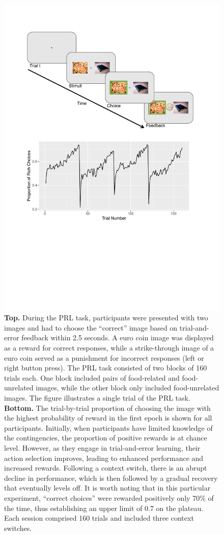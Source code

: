 \documentclass[
  man,floatsintext]{apa6}
\begin{document}
\begin{figure}

{\centering \includegraphics[width=0.85\linewidth]{img/pics/prl_task} 

}

\caption{\textbf{Top.} During the PRL task, participants were presented with two images and had to choose the ``correct'' image based on trial-and-error feedback within 2.5 seconds. A euro coin image was displayed as a reward for correct responses, while a strike-through image of a euro coin served as a punishment for incorrect responses (left or right button press). The PRL task consisted of two blocks of 160 trials each. One block included pairs of food-related and food-unrelated images, while the other block only included food-unrelated images. The figure illustrates a single trial of the PRL task. \textbf{Bottom.} The trial-by-trial proportion of choosing the image with the highest probability of reward in the first epoch is shown for all participants. Initially, when participants have limited knowledge of the contingencies, the proportion of positive rewards is at chance level. However, as they engage in trial-and-error learning, their action selection improves, leading to enhanced performance and increased rewards. Following a context switch, there is an abrupt decline in performance, which is then followed by a gradual recovery that eventually levels off. It is worth noting that in this particular experiment, ``correct choices'' were rewarded positively only 70\% of the time, thus establishing an upper limit of 0.7 on the plateau. Each session comprised 160 trials and included three context switches.}\label{fig:prl-task}
\end{figure}
\end{document}
